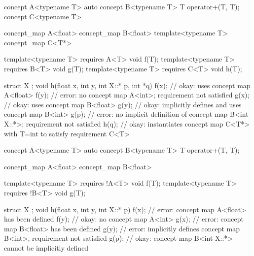 \documentclass[american]{book}
\begin{document}
\begin{paras}
\pnum
{}
\addedConcepts{\mbox{\enterexample}}
\begin{codeblock}
concept A<typename T> { }
auto concept B<typename T> { T operator+(T, T); }
concept C<typename T> { }

concept_map A<float> { }
concept_map B<float> { }
template<typename T> concept_map C<T*> { }

template<typename T> requires A<T> void f(T);
template<typename T> requires B<T> void g(T);
template<typename T> requires C<T> void h(T);

struct X { };
void h(float x, int y, int X::* p, int *q) {
  f(x); // okay: uses concept map A<float>
  f(y); // error: no concept map A<int>; requirement not satisfied
  g(x); // okay: uses concept map B<float>
  g(y); // okay: implicitly defines and uses concept map B<int>
  g(p); // error: no implicit definition of concept map B<int X::*>; requirement not satisfied
  h(q); // okay: instantiates concept map C<T*> with T=int to satisfy requirement C<T>
}
\end{codeblock}
\addedConcepts{\mbox{\exitexample}}

\pnum 
{}
\addedConcepts{\mbox{\enterexample}}
\begin{codeblock}
concept A<typename T> { }
auto concept B<typename T> { T operator+(T, T); }

concept_map A<float> { }
concept_map B<float> { }

template<typename T> requires !A<T> void f(T);
template<typename T> requires !B<T> void g(T);

struct X { };
void h(float x, int y, int X::* p) {
  f(x); // error: concept map A<float> has been defined
  f(y); // okay: no concept map A<int>
  g(x); // error: concept map B<float> has been defined
  g(y); // error: implicitly defines concept map B<int>, requirement not satisfied
  g(p); // okay: concept map B<int X::*> cannot be implicitly defined
}
\end{codeblock}
\addedConcepts{\mbox{\exitexample}}


\end{paras}
\end{document}
